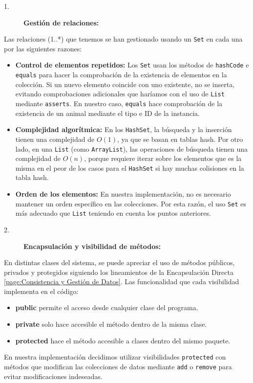 \begin{description}
    \item[1.] \textbf{Gestión de relaciones:}
\end{description}
Las relaciones (1..*) que tenemos se han gestionado usando un \texttt{Set} en cada una por las siguientes razones:
\begin{itemize}
    \item \textbf{Control de elementos repetidos:} Los \texttt{Set} usan los métodos de \texttt{hashCode} e \texttt{equals}
    para hacer la comprobación de la existencia de elementos en la colección. Si un nuevo elemento coincide con uno existente, 
    no se inserta, evitando comprobaciones adicionales que haríamos con el uso de \texttt{List} mediante \texttt{asserts}. En 
    nuestro caso, \texttt{equals} hace comprobación de la existencia de un animal mediante el tipo e ID de la instancia.
    \item \textbf{Complejidad algorítmica:} En los \texttt{HashSet}, la búsqueda y la inserción tienen una complejidad de \(O(1)\), 
    ya que se basan en tablas hash. Por otro lado, en una \texttt{List} (como \texttt{ArrayList}), las operaciones de búsqueda tienen una 
    complejidad de \(O(n)\), porque requiere iterar sobre los elementos que es la misma en el peor de los casos para el \texttt{HashSet} si hay muchas colisiones en la tabla hash.
    \item \textbf{Orden de los elementos:} En nuestra implementación, no es necesario mantener un orden específico en las colecciones. 
    Por esta razón, el uso \texttt{Set} es más adecuado que \texttt{List} teniendo en cuenta los puntos anteriores.
\end{itemize}

\begin{description}
    \item[2.] \textbf{Encapsulación y visibilidad de métodos:}
\end{description}
En distintas clases del sistema, se puede apreciar el uso de métodos públicos, privados y protegidos siguiendo los lineamientos de la Encapsulación Directa \ref{page:Consistencia y Gestión de Datos}.
Las funcionalidad que cada visibilidad implementa en el código:
\begin{itemize}
    \item \textbf{public} permite el acceso desde cualquier clase del programa.
    \item \textbf{private} solo hace accesible el método dentro de la misma clase.
    \item \textbf{protected} hace el método accesible a clases dentro del mismo paquete.
\end{itemize}
En nuestra implementación decidimos utilizar visibilidades \texttt{protected} con métodos que modifican las colecciones de datos mediante \texttt{add} o \texttt{remove} 
para evitar modificaciones indeseadas.\par
\vspace{0.20cm}

